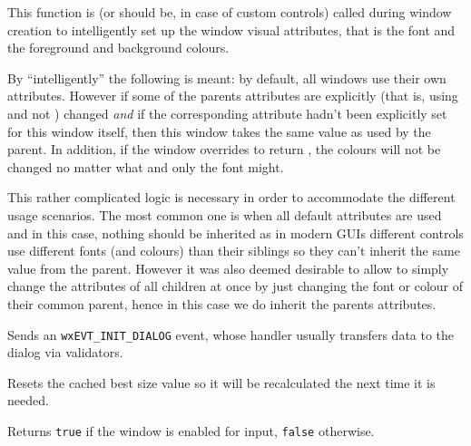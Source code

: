 
This function is (or should be, in case of custom controls) called during
window creation to intelligently set up the window visual attributes, that is
the font and the foreground and background colours.

By ``intelligently'' the following is meant: by default, all windows use their
own  attributes. However
if some of the parents attributes are explicitly (that is, using
 and not
) changed \emph{and} if the
corresponding attribute hadn't been explicitly set for this window itself,
then this window takes the same value as used by the parent. In addition, if
the window overrides 
to return \false, the colours will not be changed no matter what and only the
font might.

This rather complicated logic is necessary in order to accommodate the
different usage scenarios. The most common one is when all default attributes
are used and in this case, nothing should be inherited as in modern GUIs
different controls use different fonts (and colours) than their siblings so
they can't inherit the same value from the parent. However it was also deemed
desirable to allow to simply change the attributes of all children at once by
just changing the font or colour of their common parent, hence in this case we
do inherit the parents attributes.


\label{wxwindowinitdialog}


Sends an {\tt wxEVT\_INIT\_DIALOG} event, whose handler usually transfers data
to the dialog via validators.


\label{wxwindowinvalidatebestsize}


Resets the cached best size value so it will be recalculated the next time it is needed.


\label{wxwindowisenabled}


Returns {\tt true} if the window is enabled for input, {\tt false} otherwise.


